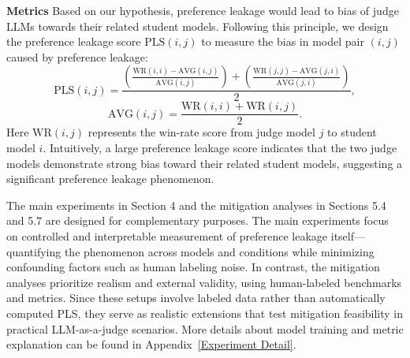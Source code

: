 \documentclass{article} %
\begin{document}


\textbf{Metrics}
Based on our hypothesis, preference leakage would lead to bias of judge LLMs towards their related student models. Following this principle, we design the preference leakage score $\text{PLS}(i, j)$ to measure the bias in model pair $(i, j)$ caused by preference leakage:
\begin{equation}
    \text{PLS}(i, j) = \frac{\left(\frac{\text{WR}(i, i) - \text{AVG}(i, j)}{\text{AVG}(i, j)}\right) + \left(\frac{\text{WR}(j, j) - \text{AVG}(j, i)}{\text{AVG}(j, i)}\right)}{2},
\end{equation}
\begin{equation}
    \text{AVG}(i, j) = \frac{\text{WR}(i, i) + \text{WR}(i, j)}{2}.
\end{equation}
Here $\text{WR}(i, j)$ represents the win-rate score from judge model $j$ to student model $i$. Intuitively, a large preference leakage score indicates that the two judge models demonstrate strong bias toward their related student models, suggesting a significant preference leakage phenomenon.

The main experiments in Section 4 and the mitigation analyses in Sections 5.4 and 5.7 are designed for complementary purposes. The main experiments focus on controlled and interpretable measurement of preference leakage itself—quantifying the phenomenon across models and conditions while minimizing confounding factors such as human labeling noise. In contrast, the mitigation analyses prioritize realism and external validity, using human-labeled benchmarks and metrics. Since these setups involve labeled data rather than automatically computed PLS, they serve as realistic extensions that test mitigation feasibility in practical LLM-as-a-judge scenarios. More details about model training and metric explanation can be found in Appendix~\ref{Experiment Detail}.
\end{document}
